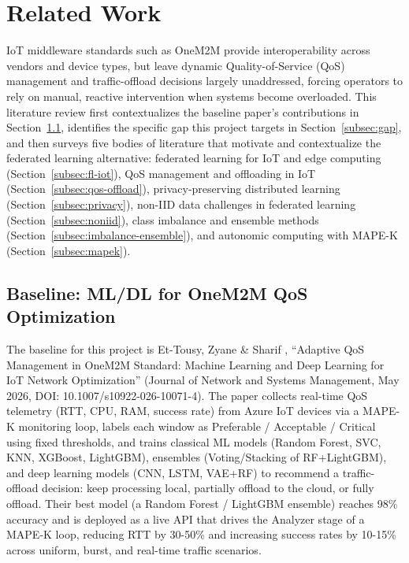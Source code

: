 
\section{Related Work}
\label{sec:rw}

IoT middleware standards such as OneM2M provide interoperability across vendors and device types, but leave dynamic Quality-of-Service (QoS) management and traffic-offload decisions largely unaddressed, forcing operators to rely on manual, reactive intervention when systems become overloaded. This literature review first contextualizes the baseline paper's contributions in Section~\ref{subsec:baseline}, identifies the specific gap this project targets in Section~\ref{subsec:gap}, and then surveys five bodies of literature that motivate and contextualize the federated learning alternative: federated learning for IoT and edge computing (Section~\ref{subsec:fl-iot}), QoS management and offloading in IoT (Section~\ref{subsec:qos-offload}), privacy-preserving distributed learning (Section~\ref{subsec:privacy}), non-IID data challenges in federated learning (Section~\ref{subsec:noniid}), class imbalance and ensemble methods (Section~\ref{subsec:imbalance-ensemble}), and autonomic computing with MAPE-K (Section~\ref{subsec:mapek}).

\subsection{Baseline: ML/DL for OneM2M QoS Optimization}
\label{subsec:baseline}

The baseline for this project is Et-Tousy, Zyane \& Sharif \cite{EtTousy26}, ``Adaptive QoS Management in OneM2M Standard: Machine Learning and Deep Learning for IoT Network Optimization'' (Journal of Network and Systems Management, May 2026, DOI: 10.1007/s10922-026-10071-4). The paper collects real-time QoS telemetry (RTT, CPU, RAM, success rate) from Azure IoT devices via a MAPE-K monitoring loop, labels each window as Preferable / Acceptable / Critical using fixed thresholds, and trains classical ML models (Random Forest, SVC, KNN, XGBoost, LightGBM), ensembles (Voting/Stacking of RF+LightGBM), and deep learning models (CNN, LSTM, VAE+RF) to recommend a traffic-offload decision: keep processing local, partially offload to the cloud, or fully offload. Their best model (a Random Forest / LightGBM ensemble) reaches 98\% accuracy and is deployed as a live API that drives the Analyzer stage of a MAPE-K loop, reducing RTT by 30-50\% and increasing success rates by 10-15\% across uniform, burst, and real-time traffic scenarios.

